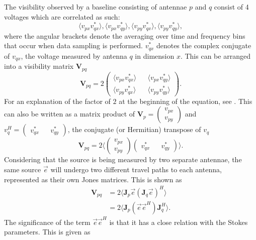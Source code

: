 \documentclass{article}
\begin{document}
The visibility observed by a baseline consisting of antennae $p$ and $q$ consist of 4 voltages which are correlated as such:
\[
\langle v_{px} v^*_{qx} \rangle , \langle v_{px} v^*_{qy} \rangle , \langle v_{py} v^*_{qx} \rangle , \langle v_{py} v^*_{qy} \rangle ,
\]
where the angular brackets denote the averaging over time and frequency bins that occur when data sampling is performed. $v^*_{qx}$ denotes the complex conjugate of $v_{qx}$, the voltage measured by antenna $q$ in dimension $x$. This can be arranged into a visibility matrix $\mathbf{V}_{pq}$
\begin{equation}
\mathbf{V}_{pq} = 2\begin{pmatrix} 
\langle v_{px} v^*_{qx} \rangle && \langle v_{px} v^*_{qy} \rangle \\
\langle v_{py} v^*_{qx} \rangle && \langle v_{py} v^*_{qy} \rangle
\end{pmatrix} .
\end{equation}
For an explanation of the factor of $2$ at the beginning of the equation, see \cite{smirnov2011}. This can also be written as a matrix product of $\mathbf{V}_{p} = \begin{pmatrix} v_{px} \\ v_{py} \end{pmatrix}$ and $v^H_{q} = \begin{pmatrix} v^*_{qx} && v^*_{qy} \end{pmatrix}$, the conjugate (or Hermitian) transpose of $v_q$
\begin{equation}
\mathbf{V}_{pq} = 2 \langle \begin{pmatrix} v_{px} \\ v_{py} \end{pmatrix} \begin{pmatrix} v^*_{qx} && v^*_{qy} \end{pmatrix} \rangle .
\end{equation}
Considering that the source is being measured by two separate antennae, the same source $\Vec{e}$ will undergo two different travel paths to each antenna, represented as their own Jones matrices. This is shown as
\begin{align}
\mathbf{V}_{pq} &= 2\langle \mathbf{J}_p \Vec{e} ( \mathbf{J}_q \Vec{e} ) ^H  \rangle \\
&= 2\langle \mathbf{J}_p (\Vec{e} \Vec{e}^H) \mathbf{J}_q^H \rangle . \label{eq:difpaths}
\end{align}
The significance of the term $\Vec{e}\Vec{e}^H$ is that it has a close relation with the Stokes parameters\citep{bornwolf1964, thompson2008}. This is given as
\end{document}
